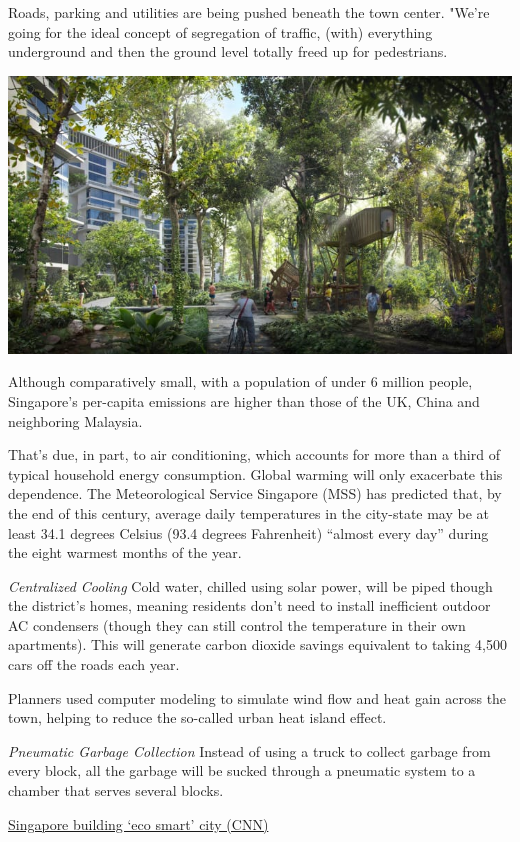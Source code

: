 \documentclass[
]{book}
\begin{document}
Roads, parking and utilities are being pushed beneath the town center. "We're going for the ideal concept of segregation of traffic, (with) everything underground and then the ground level totally freed up for pedestrians.

\includegraphics{fig/Singapore_Tengah_Forest_Town.jpg}

Although comparatively small, with a population of under 6 million people, Singapore's per-capita emissions are higher than those of the UK, China and neighboring Malaysia.

That's due, in part, to air conditioning, which accounts for more than a third of typical household energy consumption. Global warming will only exacerbate this dependence. The Meteorological Service Singapore (MSS) has predicted that, by the end of this century, average daily temperatures in the city-state may be at least 34.1 degrees Celsius (93.4 degrees Fahrenheit) ``almost every day'' during the eight warmest months of the year.

\emph{Centralized Cooling}
Cold water, chilled using solar power, will be piped though the district's homes, meaning residents don't need to install inefficient outdoor AC condensers (though they can still control the temperature in their own apartments).
This will generate carbon dioxide savings equivalent to taking 4,500 cars off the roads each year.

Planners used computer modeling to simulate wind flow and heat gain across the town, helping to reduce the so-called urban heat island effect.

\emph{Pneumatic Garbage Collection}
Instead of using a truck to collect garbage from every block, all the garbage will be sucked
through a pneumatic system to a chamber that serves several blocks.

\href{https://edition.cnn.com/style/article/singapore-tengah-eco-town/index.html}{Singapore building `eco smart' city (CNN)}
\end{document}
